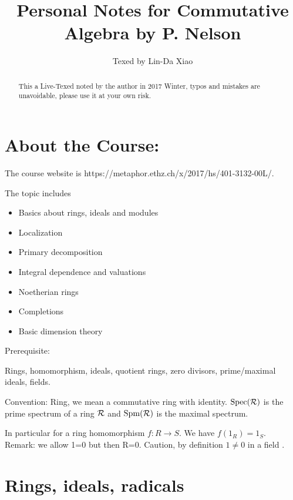 \documentclass[11pt]{article}
\title{\bf Personal Notes for Commutative Algebra by P. Nelson}
\author{Texed by Lin-Da Xiao} %
\newcommand{\calr}{{\cal R}}
\begin{document}
\maketitle
\begin{abstract}
This a Live-Texed noted by the author in 2017 Winter, typos and mistakes are unavoidable, please use it at your own risk.
\end{abstract}
\tableofcontents
\newpage

\section*{About the Course:}
The course website is https://metaphor.ethz.ch/x/2017/hs/401-3132-00L/. 

The topic includes
\begin{itemize}
\item 
Basics about rings, ideals and modules
\item 
Localization
\item 
Primary decomposition
\item 
Integral dependence and valuations
\item 
Noetherian rings
\item 
Completions
\item 
Basic dimension theory
\end{itemize}

Prerequisite:

Rings, homomorphism, ideals, quotient rings, zero divisors, prime/maximal ideals, fields.

Convention: 
Ring, we mean a commutative ring with identity. $\text{Spec}(\calr)$ is the prime spectrum of a ring $\calr$ and $\text{Spm}(\calr)$ is the maximal spectrum.

In particular for a ring homomorphism $f:R\rightarrow S$. We have $f(1_R)=1_S$.
 
Remark:
we allow 1=0 but then R=0.
Caution, by definition $1\neq 0$ in a field .
\section{Rings, ideals, radicals}
\end{document}
